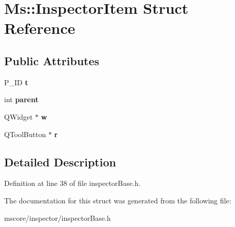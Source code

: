 \hypertarget{struct_ms_1_1_inspector_item}{}\section{Ms\+:\+:Inspector\+Item Struct Reference}
\label{struct_ms_1_1_inspector_item}
\subsection*{Public Attributes}
\begin{DoxyCompactItemize}
\item 
\mbox{\label{struct_ms_1_1_inspector_item_ac877ef90695a88ca670882c48b7ee503}} 
P\+\_\+\+ID {\bfseries t}
\item 
\mbox{\label{struct_ms_1_1_inspector_item_a59f1681047247b22333557dab7e70ce2}} 
int {\bfseries parent}
\item 
\mbox{\label{struct_ms_1_1_inspector_item_a21c4d2f376d4f4d09c822b563b4abb82}} 
Q\+Widget $\ast$ {\bfseries w}
\item 
\mbox{\label{struct_ms_1_1_inspector_item_a0b57e8d370b65da3f79e482653657a33}} 
Q\+Tool\+Button $\ast$ {\bfseries r}
\end{DoxyCompactItemize}


\subsection{Detailed Description}


Definition at line 38 of file inspector\+Base.\+h.



The documentation for this struct was generated from the following file\+:\begin{DoxyCompactItemize}
\item 
mscore/inspector/inspector\+Base.\+h\end{DoxyCompactItemize}
